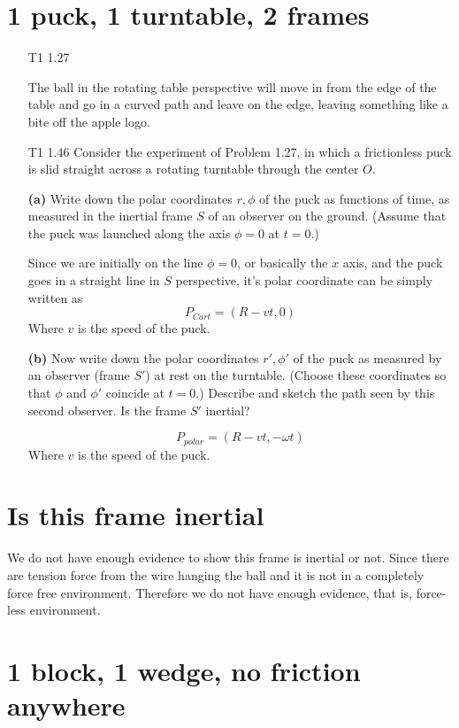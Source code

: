 \documentclass[12pt]{article}
\newcommand{\paren}[1]{\left( #1 \right)}
\begin{document}
\section{1 puck, 1 turntable, 2 frames}
\begin{enumerate}
    \item[T1 1.27]

    The ball in the rotating table perspective will move in from the edge of the table and go in a curved path and leave on the edge, leaving something like a bite off the apple logo.

    \item[T1 1.46] Consider the experiment of Problem 1.27, in which a frictionless puck is slid straight across a rotating turntable through the center \(O\).

\textbf{(a)} Write down the polar coordinates \(r, \phi\) of the puck as functions of time, as measured in the inertial frame \(S\) of an observer on the ground. (Assume that the puck was launched along the axis \(\phi = 0\) at \(t = 0\).)

Since we are initially on the line $\phi = 0$, or basically the $x$ axis, and the puck goes in a straight line in $S$ perspective, it's polar coordinate can be simply written as
\[
P_{Cart} = (R-v t, 0)
\]
Where $v$ is the speed of the puck.

\textbf{(b)} Now write down the polar coordinates \(r', \phi'\) of the puck as measured by an observer (frame \(S'\)) at rest on the turntable. (Choose these coordinates so that \(\phi\) and \(\phi'\) coincide at \(t = 0\).) Describe and sketch the path seen by this second observer. Is the frame \(S'\) inertial?

\[
P_{polar} = \paren{ R - vt, -\omega t}
\]
Where $v$ is the speed of the puck.

\end{enumerate}

\section{Is this frame inertial}
We do not have enough evidence to show this frame is inertial or not. Since there are tension force from the wire hanging the ball and it is not in a completely force free environment. Therefore we do not have enough evidence, that is, force-less environment. 


\section{1 block, 1 wedge, no friction anywhere}
\end{document}
